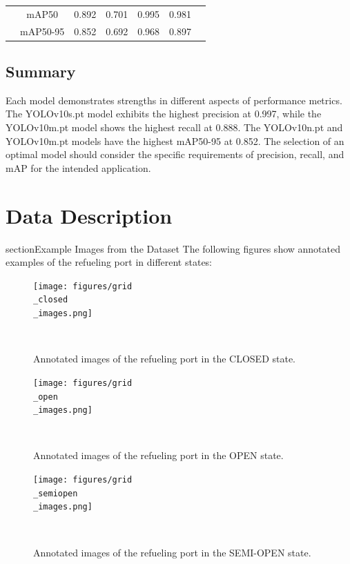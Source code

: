 \documentclass[12pt,oneside]{book} %
\begin{document}
\begin{table}[h!]
\begin{adjustbox}{max width=\textwidth}
\begin{tabular}{lcccccc}
                                                  & mAP50           & 0.892        & 0.701                       & 0.995                          & 0.981                     \\
                                                  & mAP50-95        & 0.852        & 0.692                       & 0.968                          & 0.897                     \\
            \bottomrule
        \end{tabular}
    \end{adjustbox}
    \label{tab:comparison}
\end{table}

\subsection{Summary}

Each model demonstrates strengths in different aspects of performance metrics.
The YOLOv10s.pt model exhibits the highest precision at 0.997, while the
YOLOv10m.pt model shows the highest recall at 0.888. The YOLOv10n.pt and
YOLOv10m.pt models have the highest mAP50-95 at 0.852. The selection of an
optimal model should consider the specific requirements of precision, recall,
and mAP for the intended application.

\section{Data Description}
\:section{Example Images from the Dataset}
The following figures show annotated examples of the refueling port in
different states:
\begin{figure}[H]
    \centering
    \texttt{[image: figures/grid\\\_closed\\\_images.png]}
    \caption{Annotated images of the refueling port in the CLOSED state.}~\label{fig:grid-closed-images}
\end{figure}

\begin{figure}[H]
    \centering
    \texttt{[image: figures/grid\\\_open\\\_images.png]}
    \caption{Annotated images of the refueling port in the OPEN state.}~\label{fig:grid-open-images}
\end{figure}

\begin{figure}[H]
    \centering
    \texttt{[image: figures/grid\\\_semiopen\\\_images.png]}
    \caption{Annotated images of the refueling port in the SEMI-OPEN state.}~\label{fig:grid-semi-open-images}
\end{figure}
\end{document}
